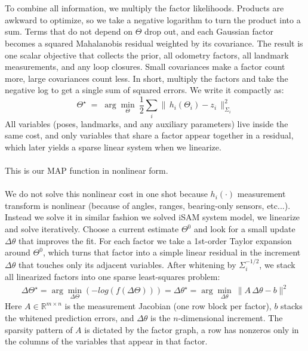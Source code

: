 \\ \\
To combine all information, we multiply the factor likelihoods. Products are awkward to optimize, so we take a negative logarithm to turn the product into a sum. Terms that do not depend on $\Theta$ drop out, and each Gaussian factor becomes a squared Mahalanobis residual weighted by its covariance. The result is one scalar objective that collects the prior, all odometry factors, all landmark measurements, and any loop closures. Small covariances make a factor count more, large covariances count less. In short, multiply the factors and take the negative log to get a single sum of squared errors. We write it compactly as:
\[
    \Theta^\star \;=\;\arg\min_{\Theta}\ \frac12\sum_i \|\,h_i(\Theta_i)-z_i\,\|^2_{\Sigma_i}
\]
All variables (poses, landmarks, and any auxiliary parameters) live inside the same cost, and only variables that share a factor appear together in a residual, which later yields a sparse linear system when we linearize.
\\ \\
This is our \gls{MAP} function in nonlinear form.
\\ \\
We do not solve this nonlinear cost in one shot because $h_i(\cdot)$ measurement transform is nonlinear (because of angles, ranges, bearing-only sensors, etc...). Instead we solve it in similar fashion we solved \gls{iSAM} system model, we linearize and solve iteratively. Choose a current estimate $\Theta^0$ and look for a small update $\Delta\theta$ that improves the fit. For each factor we take a 1st-order Taylor expansion around $\Theta^0$, which turns that factor into a simple linear residual in the increment $\Delta\theta$ that touches only its adjacent variables. After whitening by $\Sigma_i^{-1/2}$, we stack all linearized factors into one sparse least-squares problem:
\begin{equation}
    \begin{aligned}
        \Delta\Theta^\star = \arg\min_{\Delta\Theta} \left( -log\left(f(\Delta\Theta)\right) \right) = \Delta\theta^\star = \arg\min_{\Delta\theta}\ \|A\,\Delta\theta - b\|^2
    \end{aligned}
    \label{eq:optimizer-iSAM2-least-square}
\end{equation}
Here $A\in\mathbb{R}^{m\times n}$ is the measurement Jacobian (one row block per factor), $b$ stacks the whitened prediction errors, and $\Delta\theta$ is the $n$-dimensional increment. The sparsity pattern of $A$ is dictated by the factor graph, a row has nonzeros only in the columns of the variables that appear in that factor.

